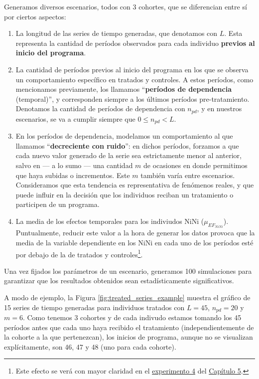 \documentclass[../../main.tex]{subfiles}
\begin{document}
Generamos diversos escenarios, todos con 3 cohortes, que se diferencian entre sí por
ciertos aspectos:
\begin{enumerate}[itemsep=0.05cm, label=\textbf{\arabic*.}]
    \item La longitud de las series de tiempo generadas, que denotamos con \(L\). Esta
    representa la cantidad de períodos observados para cada individuo \textbf{previos al
    inicio del programa}.
    \item La cantidad de períodos previos al inicio del programa en los que se observa un
    comportamiento específico en tratados y controles. A estos períodos, como mencionamos
    previamente, los llamamos ``\textbf{períodos de dependencia} (temporal)'', y
    corresponden siempre a los últimos períodos pre-tratamiento. Denotamos la cantidad de
    períodos de dependencia con \(n_{pd}\), y en nuestros escenarios, se va a cumplir
    siempre que \(0 \le n_{pd} < L\).
    \item En los períodos de dependencia, modelamos un comportamiento al que llamamos
    ``\textbf{decreciente con ruido}'': en dichos períodos, forzamos a que cada nuevo
    valor generado de la serie sea estrictamente menor al anterior, salvo en — a lo sumo —
    una cantidad \(m\) de ocasiones en donde permitimos que haya subidas o incrementos.
    Este \(m\) también varía entre escenarios. Consideramos que esta tendencia es
    representativa de fenómenos reales, y que puede influir en la decisión que los
    individuos reciban un tratamiento o participen de un programa.
    \item La media de los efectos temporales para los indiviudos NiNi
    (\(\mu_{{EF}_{NiNi}}\)). Puntualmente, reducir este valor a la hora de generar los
    datos provoca que la media de la variable dependiente en los NiNi en cada uno de los
    períodos esté por debajo de la de tratados y controles\footnote{Este efecto se verá
    con mayor claridad en el \hyperref[sec:exp4]{experimento 4} del
    \hyperref[chap:resultados]{Capítulo 5}.}.
\end{enumerate}
Una vez fijados los parámetros de un escenario, generamos 100 simulaciones para garantizar
que los resultados obtenidos sean estadísticamente significativos.

A modo de ejemplo, la Figura \ref{fig:treated_series_example} muestra el gráfico de 15
series de tiempo generadas para individuos tratados con \(L=45\), \(n_{pd}=20\) y \(m=6\).
Como tenemos 3 cohortes y de cada indivudo estamos tomando los 45 períodos antes que cada
uno haya recibido el tratamiento (independientemente de la cohorte a la que pertenezcan),
los inicios de programa, aunque no se visualizan explícitamente, son 46, 47 y 48 (uno para
cada cohorte).
\end{document}
